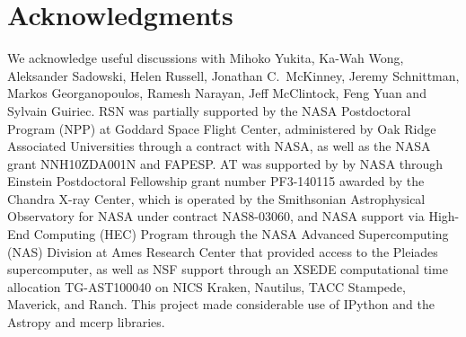 \documentclass[useAMS,usenatbib]{mn2e}
\begin{document}
\section*{Acknowledgments}

We acknowledge useful discussions with Mihoko Yukita, Ka-Wah Wong, Aleksander Sadowski, Helen Russell, Jonathan C.~McKinney, Jeremy Schnittman, Markos Georganopoulos, Ramesh Narayan, Jeff McClintock, Feng Yuan and Sylvain Guiriec. RSN was partially supported by the NASA Postdoctoral Program (NPP) at Goddard Space Flight Center, administered by Oak Ridge Associated Universities through a contract with NASA, as well as the NASA grant NNH10ZDA001N and FAPESP. AT was supported by by NASA through Einstein Postdoctoral Fellowship grant number PF3-140115 awarded by the Chandra X-ray Center, which is operated by the Smithsonian Astrophysical Observatory for NASA under contract NAS8-03060, and NASA support via High-End Computing (HEC) Program through the NASA Advanced Supercomputing (NAS) Division at Ames Research Center that provided access to the Pleiades supercomputer, as well as NSF support through an XSEDE computational time allocation TG-AST100040 on NICS Kraken, Nautilus, TACC Stampede, Maverick, and Ranch. This project made considerable use of IPython \citep{ipython} and the Astropy and mcerp libraries.



%




\bsp

\label{lastpage}
\end{document}

